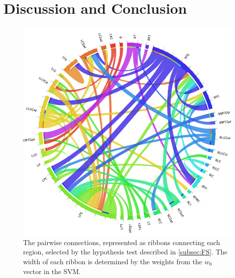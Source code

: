 \documentclass{llncs}
\begin{document}
\section{Discussion and Conclusion}
\begin{figure}
	\centering
	\includegraphics[scale = .3]{now_circos.png}
	\caption{The pairwise connections, represented as ribbons connecting each region, selected by the hypothesis test described in \ref{subsec:FS}.  The width of each ribbon is determined by the weights from the $w_0$ vector in the SVM. }
	\label{fig:circos}
\end{figure}


{}

\end{document}
